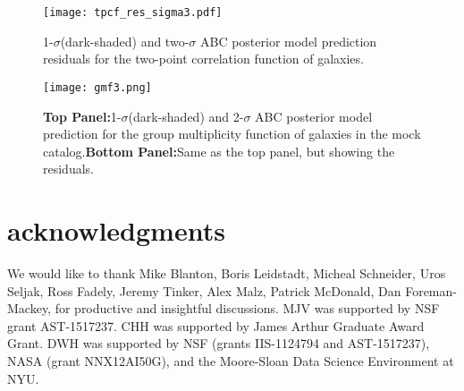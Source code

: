 \begin{figure*}
\begin{center}
  \texttt{[image: tpcf\_res\_sigma3.pdf]}
\caption{1-$\sigma$(dark-shaded) and two-$\sigma$ ABC posterior model prediction residuals
for the two-point correlation function of galaxies.}
\label{fig:2pcf-model}
\end{center}
\end{figure*}

\begin{figure*}
\begin{center}
  \texttt{[image: gmf3.png]}
\caption{{\bf Top Panel:}1-$\sigma$(dark-shaded) and 2-$\sigma$ ABC posterior model prediction 
for the group multiplicity function of galaxies in the mock catalog.{\bf Bottom Panel:}Same as the top panel, but showing the residuals.}
\label{fig:2pcf-model}
\end{center}
\end{figure*}

\section*{acknowledgments}

We would like to thank Mike Blanton, Boris Leidstadt, Micheal Schneider, Uros Seljak, Ross Fadely, Jeremy Tinker, Alex Malz, Patrick McDonald, Dan Foreman-Mackey, for productive and insightful discussions. 
MJV was supported by NSF grant AST-1517237. CHH was supported by James Arthur Graduate Award Grant.
DWH was supported by NSF (grants IIS-1124794 and AST-1517237), NASA (grant NNX12AI50G), and the Moore-Sloan Data Science Environment at NYU.




\documentclass[12pt, preprint]{aastex}
\usepackage[breaklinks,colorlinks, urlcolor=blue,citecolor=blue,linkcolor=blue]{hyperref}
\usepackage{graphicx}	%
\usepackage{natbib}	%
\usepackage{amsmath}	%
\usepackage{bm}
\usepackage[breaklinks]{hyperref}	%
\usepackage{hyperref}
\usepackage{algorithmic,algorithm}
\hypersetup{colorlinks}
\usepackage{color}
\usepackage{morefloats}
\hypersetup{ colorlinks,
linkcolor=darkblue,
filecolor=darkgreen,
urlcolor=darkred,
citecolor=darkblue}

\DeclareMathOperator*{\argmax}{arg\,max}

